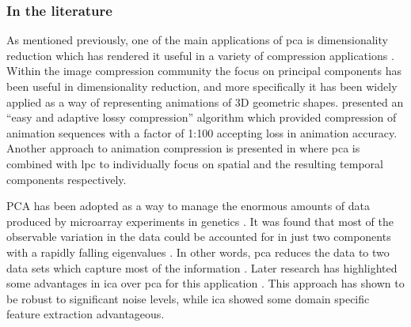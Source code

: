 %
%
%
%

\subsubsection{In the literature}
As mentioned previously, one of the main applications of \gls{pca} is dimensionality reduction which has rendered it useful in a variety of compression applications \citep{Vasilescu2003}\cite{Alexa2000}\linebreak[2]\cite{Zaeri2006}. Within the image compression community \citep{Vasilescu2003} the focus on principal components has been useful in dimensionality reduction, and more specifically it has been widely applied as a way of representing animations of 3D geometric shapes. \cite{Alexa2000} presented an ``easy and adaptive lossy compression'' algorithm which provided compression of animation sequences with a factor of 1:100 accepting loss in animation accuracy. Another approach to animation compression is presented in \cite{Karni2004} where \gls{pca} is combined with \gls{lpc} to individually focus on spatial and the resulting temporal components respectively.

PCA has been adopted as a way to manage the enormous amounts of data produced by microarray experiments in genetics \cite{Raychaudhuri2000}\cite{Saidi2004}. It was found that most of the observable variation in the data could be accounted for in just two components with a rapidly falling eigenvalues \cite{Raychaudhuri2000}. In other words, \gls{pca} reduces the data to two data sets which capture most of the information \cite{Raychaudhuri2000}. Later research has highlighted some advantages in \gls{ica} over \gls{pca} for this application \cite{Saidi2004}. This approach has shown to be robust to significant noise levels, while \gls{ica} showed some domain specific feature extraction advantageous.

